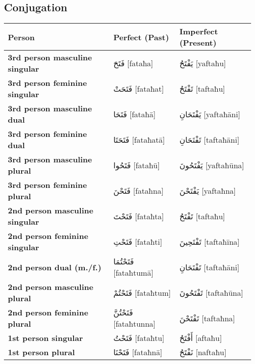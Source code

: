 \documentclass[letterpaper,12pt]{article}
\begin{document}
\subsection{Conjugation}
\begin{longtable}{|>{\raggedright}p{3.5cm}|p{5cm}|p{5cm}|}
\hline
\textbf{Person} & \textbf{Perfect (Past)} & \textbf{Imperfect (Present)} \\
\hline
\textbf{3rd person masculine singular} & \textarabic{فَتَحَ} [fataħa] & \textarabic{يَفْتَحُ} [yaftaħu] \\
\hline
\textbf{3rd person feminine singular} & \textarabic{فَتَحَتْ} [fataħat] & \textarabic{تَفْتَحُ} [taftaħu] \\
\hline
\textbf{3rd person masculine dual} & \textarabic{فَتَحَا} [fataħā] & \textarabic{يَفْتَحَانِ} [yaftaħāni] \\
\hline
\textbf{3rd person feminine dual} & \textarabic{فَتَحَتَا} [fataħatā] & \textarabic{تَفْتَحَانِ} [taftaħāni] \\
\hline
\textbf{3rd person masculine plural} & \textarabic{فَتَحُوا} [fataħū] & \textarabic{يَفْتَحُونَ} [yaftaħūna] \\
\hline
\textbf{3rd person feminine plural} & \textarabic{فَتَحْنَ} [fataħna] & \textarabic{يَفْتَحْنَ} [yaftaħna] \\
\hline
\textbf{2nd person masculine singular} & \textarabic{فَتَحْتَ} [fataħta] & \textarabic{تَفْتَحُ} [taftaħu] \\
\hline
\textbf{2nd person feminine singular} & \textarabic{فَتَحْتِ} [fataħti] & \textarabic{تَفْتَحِينَ} [taftaħīna] \\
\hline
\textbf{2nd person dual (m./f.)} & \textarabic{فَتَحْتُمَا} [fataħtumā] & \textarabic{تَفْتَحَانِ} [taftaħāni] \\
\hline
\textbf{2nd person masculine plural} & \textarabic{فَتَحْتُمْ} [fataħtum] & \textarabic{تَفْتَحُونَ} [taftaħūna] \\
\hline
\textbf{2nd person feminine plural} & \textarabic{فَتَحْتُنَّ} [fataħtunna] & \textarabic{تَفْتَحْنَ} [taftaħna] \\
\hline
\textbf{1st person singular} & \textarabic{فَتَحْتُ} [fataħtu] & \textarabic{أَفْتَحُ} [aftaħu] \\
\hline
\textbf{1st person plural} & \textarabic{فَتَحْنَا} [fataħnā] & \textarabic{نَفْتَحُ} [naftaħu] \\
\hline
\end{longtable}
\end{document}

